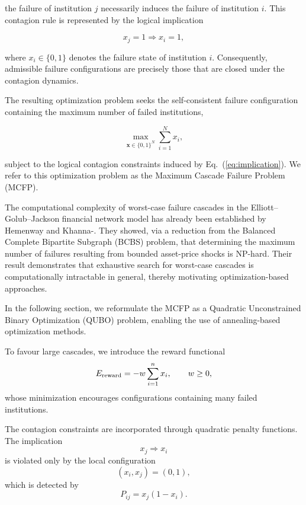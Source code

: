 \documentclass[aps,reprint,superscriptaddress,pra]{revtex4-2}
\begin{document}
the failure of institution $j$ necessarily induces the failure of institution $i$. This contagion rule is represented by the logical implication

\begin{equation}
x_j=1
\Longrightarrow
x_i=1,
\label{eq:implication}
\end{equation}

where $x_i\in\{0,1\}$ denotes the failure state of institution $i$. Consequently, admissible failure configurations are precisely those that are closed under the contagion dynamics.

The resulting optimization problem seeks the self-consistent failure configuration containing the maximum number of failed institutions,

\begin{equation}
\max_{\mathbf{x}\in\{0,1\}^N}
\sum_{i=1}^{N}x_i,
\end{equation}

subject to the logical contagion constraints induced by Eq.~(\ref{eq:implication}). We refer to this optimization problem as the Maximum Cascade Failure Problem (MCFP).

The computational complexity of worst-case failure cascades in the Elliott--Golub--Jackson financial network model has already been established by Hemenway and Khanna-\cite{hemenway2016sensitivity,schuldenzucker2017,garey1979computers}. They showed, via a reduction from the Balanced Complete Bipartite Subgraph (BCBS) problem, that determining the maximum number of failures resulting from bounded asset-price shocks is NP-hard. Their result demonstrates that exhaustive search for worst-case cascades is computationally intractable in general, thereby motivating optimization-based approaches.

In the following section, we reformulate the MCFP as a Quadratic Unconstrained Binary Optimization (QUBO) problem, enabling the use of annealing-based optimization methods.

To favour large cascades, we introduce the reward functional
\begin{equation}
E_{\rm reward}
=
-w
\sum_{i=1}^{n}x_i,
\qquad
w \geq 0,
\end{equation}
whose minimization encourages configurations containing many failed institutions.

The contagion constraints are incorporated through quadratic penalty functions. The implication
\[
x_j\Rightarrow x_i
\]
is violated only by the local configuration
\[
(x_i,x_j)=(0,1),
\]
which is detected by
\begin{equation}
P_{ij}
=
x_j(1-x_i).
\end{equation}
\end{document}
